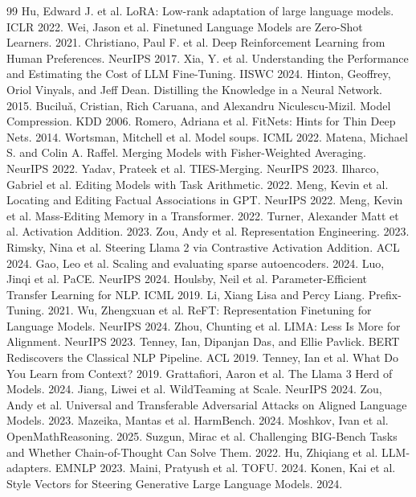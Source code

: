\begin{thebibliography}{99}
 Hu, Edward J. et al. LoRA: Low-rank adaptation of large language models. ICLR 2022.
 Wei, Jason et al. Finetuned Language Models are Zero-Shot Learners. 2021.
 Christiano, Paul F. et al. Deep Reinforcement Learning from Human Preferences. NeurIPS 2017.
 Xia, Y. et al. Understanding the Performance and Estimating the Cost of LLM Fine-Tuning. IISWC 2024.
 Hinton, Geoffrey, Oriol Vinyals, and Jeff Dean. Distilling the Knowledge in a Neural Network. 2015.
 Bucilu{\v{a}}, Cristian, Rich Caruana, and Alexandru Niculescu-Mizil. Model Compression. KDD 2006.
 Romero, Adriana et al. FitNets: Hints for Thin Deep Nets. 2014.
 Wortsman, Mitchell et al. Model soups. ICML 2022.
 Matena, Michael S. and Colin A. Raffel. Merging Models with Fisher-Weighted Averaging. NeurIPS 2022.
 Yadav, Prateek et al. TIES-Merging. NeurIPS 2023.
 Ilharco, Gabriel et al. Editing Models with Task Arithmetic. 2022.
 Meng, Kevin et al. Locating and Editing Factual Associations in GPT. NeurIPS 2022.
 Meng, Kevin et al. Mass-Editing Memory in a Transformer. 2022.
 Turner, Alexander Matt et al. Activation Addition. 2023.
 Zou, Andy et al. Representation Engineering. 2023.
 Rimsky, Nina et al. Steering Llama 2 via Contrastive Activation Addition. ACL 2024.
 Gao, Leo et al. Scaling and evaluating sparse autoencoders. 2024.
 Luo, Jinqi et al. PaCE. NeurIPS 2024.
 Houlsby, Neil et al. Parameter-Efficient Transfer Learning for NLP. ICML 2019.
 Li, Xiang Lisa and Percy Liang. Prefix-Tuning. 2021.
 Wu, Zhengxuan et al. ReFT: Representation Finetuning for Language Models. NeurIPS 2024.
 Zhou, Chunting et al. LIMA: Less Is More for Alignment. NeurIPS 2023.
 Tenney, Ian, Dipanjan Das, and Ellie Pavlick. BERT Rediscovers the Classical NLP Pipeline. ACL 2019.
 Tenney, Ian et al. What Do You Learn from Context? 2019.
 Grattafiori, Aaron et al. The Llama 3 Herd of Models. 2024.
 Jiang, Liwei et al. WildTeaming at Scale. NeurIPS 2024.
 Zou, Andy et al. Universal and Transferable Adversarial Attacks on Aligned Language Models. 2023.
 Mazeika, Mantas et al. HarmBench. 2024.
 Moshkov, Ivan et al. OpenMathReasoning. 2025.
 Suzgun, Mirac et al. Challenging BIG-Bench Tasks and Whether Chain-of-Thought Can Solve Them. 2022.
 Hu, Zhiqiang et al. LLM-adapters. EMNLP 2023.
 Maini, Pratyush et al. TOFU. 2024.
 Konen, Kai et al. Style Vectors for Steering Generative Large Language Models. 2024.
\end{thebibliography}

